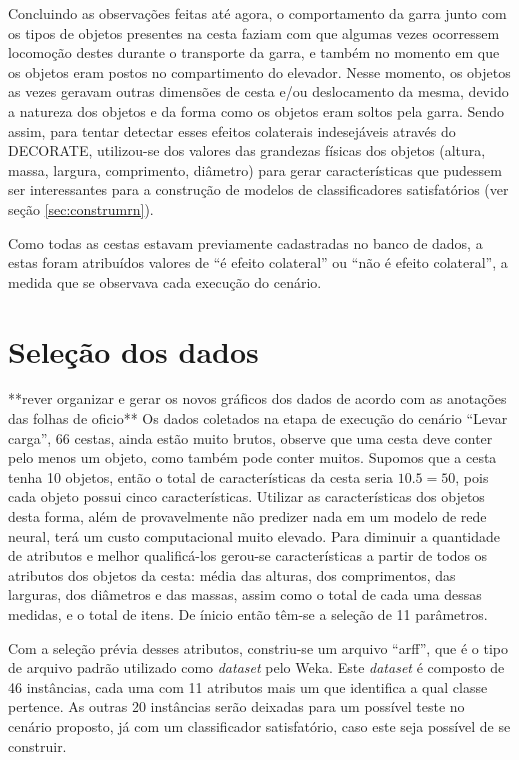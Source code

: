 Concluindo as observações feitas até agora, o comportamento da garra junto com os tipos de objetos presentes na cesta faziam com que algumas vezes ocorressem locomoção destes durante o transporte da garra, e também no momento em que os objetos eram postos no compartimento do elevador. Nesse momento, os objetos as vezes geravam outras dimensões de cesta e/ou deslocamento da mesma, devido a natureza dos objetos e da forma como os objetos eram soltos pela garra. Sendo assim, para tentar detectar esses efeitos colaterais indesejáveis através do DECORATE, utilizou-se dos valores das grandezas físicas dos objetos (altura, massa, largura, comprimento, diâmetro) para gerar características que pudessem ser interessantes para a construção de modelos de classificadores satisfatórios (ver seção \ref{sec:construmrn}).

Como todas as cestas estavam previamente cadastradas no banco de dados, a estas foram atribuídos valores de ``é efeito colateral'' ou ``não é efeito colateral'', a medida que se observava cada execução do cenário.

\section{Seleção dos dados}**rever organizar e gerar os novos gráficos dos dados de acordo com as anotações das folhas de oficio**
Os dados coletados na etapa de execução do cenário ``Levar carga'', 66 cestas, ainda estão muito brutos, observe que uma cesta deve conter pelo menos um objeto, como também pode conter muitos. Supomos que a cesta tenha 10 objetos, então o total de características da cesta seria $10.5=50$, pois cada objeto possui cinco características. Utilizar as características dos objetos desta forma, além de provavelmente não predizer nada em um modelo de rede neural, terá um custo computacional muito elevado. Para diminuir a quantidade de atributos e melhor qualificá-los gerou-se características a partir de todos os atributos dos objetos da cesta: média das alturas, dos comprimentos, das larguras, dos diâmetros e das massas, assim como o total de cada uma dessas medidas, e o total de itens. De ínicio então têm-se a seleção de 11 parâmetros.

Com a seleção prévia desses atributos, constriu-se um arquivo ``arff'', que é o tipo de arquivo padrão utilizado como \textit{dataset} pelo Weka\cite{Hall:2009}. Este \textit{dataset} é composto de 46 instâncias, cada uma com 11 atributos mais um que identifica a qual classe pertence. As outras 20 instâncias serão deixadas para um possível teste no cenário proposto, já com um classificador satisfatório, caso este seja possível de se construir.

